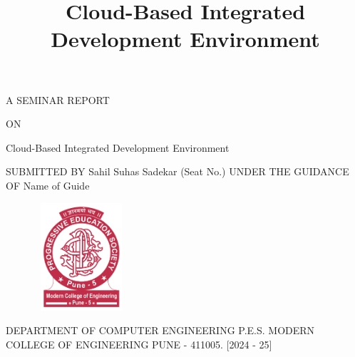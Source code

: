 \documentclass[12pt,a4paper,final]{report}
\title{Cloud-Based Integrated Development Environment}
\begin{document}
\begin{center}
\thispagestyle{empty}
\vspace*{1cm}
A SEMINAR REPORT
\vspace*{0.75cm}

ON
\vspace*{0.75cm}

\Large
Cloud-Based Integrated Development Environment
\vspace*{0.75cm}


\vspace*{0.5cm}
SUBMITTED BY
\vspace*{0.35cm}
\linebreak
\linebreak
Sahil Suhas Sadekar (Seat No.)
\linebreak
\linebreak
\vspace*{0.5cm}
\linebreak
UNDER THE GUIDANCE OF
\vspace*{0.35cm}
\linebreak
\linebreak
Name of Guide
\vspace*{0.3cm}
\normalsize
\begin{figure}[h]
\begin{center}
\includegraphics[width=3.5cm, height=4.0cm]{logo.png}
\end{center}
\end{figure}



\large
\vspace*{0.3cm}
DEPARTMENT OF COMPUTER ENGINEERING
\linebreak
P.E.S. MODERN COLLEGE OF ENGINEERING
\linebreak
PUNE - 411005.
\linebreak
$[$2024 - 25$]$ 
\end{center}
\newpage
\end{document}
